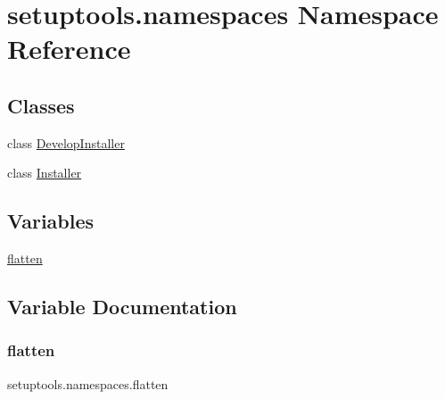 \hypertarget{namespacesetuptools_1_1namespaces}{}\section{setuptools.\+namespaces Namespace Reference}
\label{namespacesetuptools_1_1namespaces}
\subsection*{Classes}
\begin{DoxyCompactItemize}
\item 
class \hyperlink{classsetuptools_1_1namespaces_1_1DevelopInstaller}{Develop\+Installer}
\item 
class \hyperlink{classsetuptools_1_1namespaces_1_1Installer}{Installer}
\end{DoxyCompactItemize}
\subsection*{Variables}
\begin{DoxyCompactItemize}
\item 
\hyperlink{namespacesetuptools_1_1namespaces_ac526d0a5bfb5f02e06baaacd8ea73a8a}{flatten}
\end{DoxyCompactItemize}


\subsection{Variable Documentation}
\mbox{\label{namespacesetuptools_1_1namespaces_ac526d0a5bfb5f02e06baaacd8ea73a8a}} 
\subsubsection{\texorpdfstring{flatten}{flatten}}
{\footnotesize\ttfamily setuptools.\+namespaces.\+flatten}

